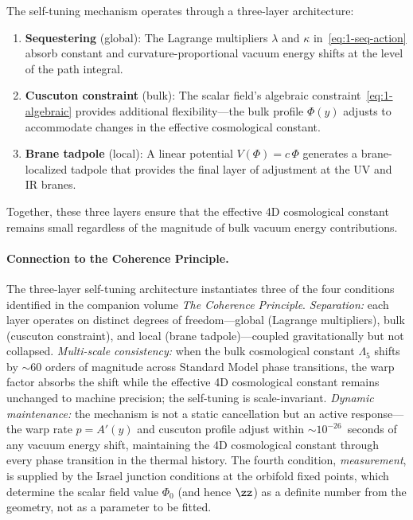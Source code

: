 The self-tuning mechanism operates through a three-layer architecture:
\begin{enumerate}
\item \textbf{Sequestering} (global): The Lagrange multipliers $\lambda$ and $\kappa$ in~\eqref{eq:1-seq-action} absorb constant and curvature-proportional vacuum energy shifts at the level of the path integral.

\item \textbf{Cuscuton constraint} (bulk): The scalar field's algebraic constraint~\eqref{eq:1-algebraic} provides additional flexibility---the bulk profile $\Phi(y)$ adjusts to accommodate changes in the effective cosmological constant.

\item \textbf{Brane tadpole} (local): A linear potential $V(\Phi) = c\,\Phi$ generates a brane-localized tadpole that provides the final layer of adjustment at the UV and IR branes.
\end{enumerate}

Together, these three layers ensure that the effective 4D cosmological constant remains small regardless of the magnitude of bulk vacuum energy contributions.

\paragraph{Connection to the Coherence Principle.}
The three-layer self-tuning architecture instantiates three of the four conditions identified in the companion volume \textit{The Coherence Principle}. \emph{Separation:} each layer operates on distinct degrees of freedom---global (Lagrange multipliers), bulk (cuscuton constraint), and local (brane tadpole)---coupled gravitationally but not collapsed. \emph{Multi-scale consistency:} when the bulk cosmological constant $\Lambda_5$ shifts by ${\sim}60$ orders of magnitude across Standard Model phase transitions, the warp factor absorbs the shift while the effective 4D cosmological constant remains unchanged to machine precision; the self-tuning is scale-invariant. \emph{Dynamic maintenance:} the mechanism is not a static cancellation but an active response---the warp rate $p = A'(y)$ and cuscuton profile adjust within ${\sim}10^{-26}$~seconds of any vacuum energy shift, maintaining the 4D cosmological constant through every phase transition in the thermal history. The fourth condition, \emph{measurement}, is supplied by the Israel junction conditions at the orbifold fixed points, which determine the scalar field value $\Phi_0$ (and hence $\zz$) as a definite number from the geometry, not as a parameter to be fitted.

